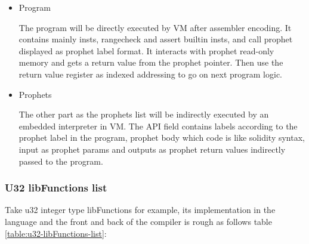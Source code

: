 \begin{itemize}
    \item Program

The program will be directly executed by VM after assembler encoding. It contains mainly insts, rangecheck and assert builtin insts,
and call prophet displayed as prophet label format. It interacts with prophet read-only memory and gets a return value from the prophet pointer.
Then use the return value register as indexed addressing to go on next program logic.
    \item Prophets

The other part as the prophets list will be indirectly executed by an embedded interpreter in VM.
The API field contains labels according to the prophet label in the program, prophet body which code is like solidity syntax,
input as prophet params and outputs as prophet return values indirectly passed to the program.
\end{itemize}

\subsubsection{U32 libFunctions list}
    Take u32 integer type libFunctions for example, its implementation in the language and the front and back of the compiler is rough as follows table \ref{table:u32-libFunctions-list}:

